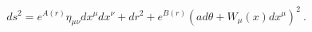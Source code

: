 \begin{equation}
ds^2 = e^{A(r)} \eta_{\mu\nu} dx^\mu dx^\nu +dr^2 + e^{B(r)}
\left(ad\theta+W_{\mu}(x) dx^\mu\right)^2~.
\label{me}
\end{equation}

